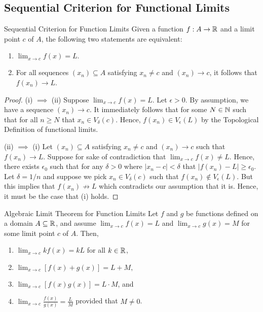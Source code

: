 \subsection{Sequential Criterion for Functional Limits}

\begin{theorem}{Sequential Criterion for Function Limits}{}
    Given a function \( f: A \to \mathbb{R}  \) and a limit point \( c \) of \( A \), the following two statements are equivalent: 
    \begin{enumerate}
        \item[(i)] \( \lim_{ x \to c } f(x) = L. \)
        \item[(ii)] For all sequences \( (x_n) \subseteq A  \) satisfying \( x_n \neq c  \) and \( (x_n) \to c  \), it follows that \( f(x_n) \to L  \).
    \end{enumerate}
    \end{theorem}

\begin{proof}
    (i) \( \implies \) (ii) Suppose \( \lim_{ x  \to c } f(x) = L  \). Let \( \epsilon > 0  \). By assumption, we have a sequence \( (x_n) \to c  \). It immediately follows that for some \( N \in \mathbb{N}  \) such that for all \( n \geq N  \) that \( x_n \in V_{\delta}(c) \). Hence, \( f(x_n) \in V_{\epsilon }(L) \) by the Topological Definition of functional limits.
 
    (ii) \( \implies \) (i) Let \( (x_n) \subseteq A  \) satisfying \( x_n \neq c  \) and \( (x_n) \to  c \) such that \( f(x_n) \to L  \). Suppose for sake of contradiction that \( \lim_{ x \to c } f(x) \neq L  \). Hence, there exists \( \epsilon_0 \) such that for any \( \delta > 0  \) where \( | x_n -c  | < \delta \) that \( | f(x_n) - L  | \geq \epsilon_0 \). Let \( \delta = 1/n \) and suppose we pick \( x_n \in V_{\delta}(c) \) such that \( f(x_n) \notin V_{\epsilon }(L) \). But this implies that \( f(x_n) \not \to L  \) which contradicts our assumption that it is. Hence, it must be the case that (i) holds.
\end{proof}

\begin{cor}{Algebraic Limit Theorem for Function Limits}{}
    Let \( f \) and \( g \) be functions defined on a domain \( A \subseteq \mathbb{R}  \), and assume \( \lim_{ x \to c } f(x) = L  \) and \( \lim_{ x \to c } g(x) = M  \) for some limit point \( c \) of \( A  \). Then, 
    \begin{enumerate}
        \item[(i)] \( \lim_{ x \to c } kf(x) = kL  \) for all \( k \in \mathbb{R}  \),
        \item[(ii)] \( \lim_{ x \to c } [f(x) + g(x)] = L + M, \)
        \item[(iii)] \( \lim_{ x \to c } [f(x)g(x)] = L \cdot M  \), and 
        \item[(iv)] \( \lim_{ x \to c } \frac{ f(x) }{ g(x)  } = \frac{ L }{ M }  \) provided that \( M \neq  0 \).
    \end{enumerate}
    \end{cor}

